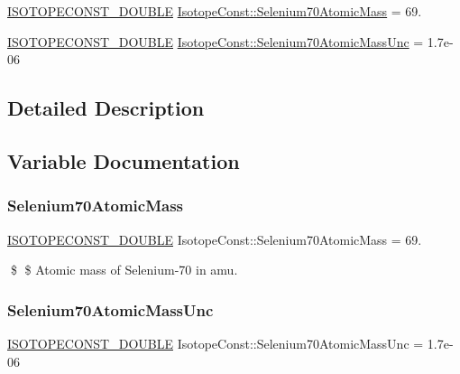\begin{DoxyCompactItemize}
\item 
\mbox{\hyperlink{group___isotope_const-_macros_ga8f45a7272ce02c0b4c65c44636ed719a}{I\+S\+O\+T\+O\+P\+E\+C\+O\+N\+S\+T\+\_\+\+D\+O\+U\+B\+LE}} \mbox{\hyperlink{group___isotope_const-_selenium-_se70_gae98bd1fd18ced3a7f6ec17b67175be42}{Isotope\+Const\+::\+Selenium70\+Atomic\+Mass}} = 69.
\item 
\mbox{\hyperlink{group___isotope_const-_macros_ga8f45a7272ce02c0b4c65c44636ed719a}{I\+S\+O\+T\+O\+P\+E\+C\+O\+N\+S\+T\+\_\+\+D\+O\+U\+B\+LE}} \mbox{\hyperlink{group___isotope_const-_selenium-_se70_gacf7212160bf91a6cca91ee6a21b6e247}{Isotope\+Const\+::\+Selenium70\+Atomic\+Mass\+Unc}} = 1.\+7e-\/06
\end{DoxyCompactItemize}


\subsection{Detailed Description}


\subsection{Variable Documentation}
\mbox{\label{group___isotope_const-_selenium-_se70_gae98bd1fd18ced3a7f6ec17b67175be42}} 
\subsubsection{\texorpdfstring{Selenium70\+Atomic\+Mass}{Selenium70AtomicMass}}
{\footnotesize\ttfamily \mbox{\hyperlink{group___isotope_const-_macros_ga8f45a7272ce02c0b4c65c44636ed719a}{I\+S\+O\+T\+O\+P\+E\+C\+O\+N\+S\+T\+\_\+\+D\+O\+U\+B\+LE}} Isotope\+Const\+::\+Selenium70\+Atomic\+Mass = 69.}

\$ \$ Atomic mass of Selenium-\/70 in amu. \mbox{\label{group___isotope_const-_selenium-_se70_gacf7212160bf91a6cca91ee6a21b6e247}} 
\subsubsection{\texorpdfstring{Selenium70\+Atomic\+Mass\+Unc}{Selenium70AtomicMassUnc}}
{\footnotesize\ttfamily \mbox{\hyperlink{group___isotope_const-_macros_ga8f45a7272ce02c0b4c65c44636ed719a}{I\+S\+O\+T\+O\+P\+E\+C\+O\+N\+S\+T\+\_\+\+D\+O\+U\+B\+LE}} Isotope\+Const\+::\+Selenium70\+Atomic\+Mass\+Unc = 1.\+7e-\/06}

